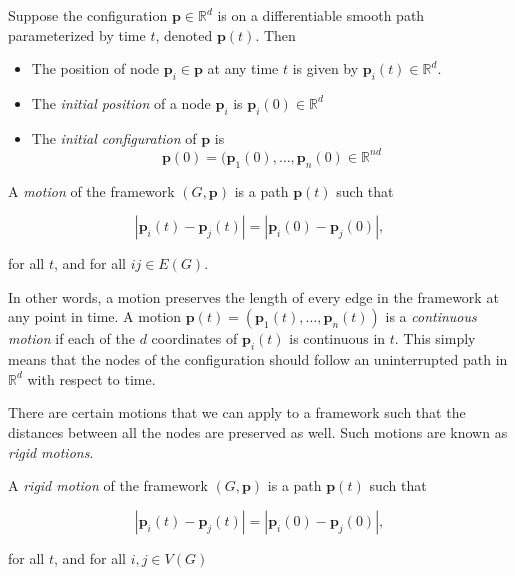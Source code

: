 \begin{definition}
Suppose the configuration $\mathbf{p} \in \mathbb{R}^d$ is on a differentiable smooth path parameterized by time $t$, denoted $\mathbf{p}(t)$. Then 

    \begin{itemize}
        \item The position of node $\mathbf{p}_i \in \mathbf{p}$ at any time $t$ is given by $\mathbf{p}_i(t) \in \mathbb{R}^d$.
        \vspace{-3mm}
        \item The \textit{initial position} of a node $\mathbf{p}_i$ is $\mathbf{p}_i(0) \in \mathbb{R}^d$
        \vspace{-3mm}
        \item The \textit{initial configuration} of $\mathbf{p}$ is 
        \[
        \mathbf{p}(0) = (\mathbf{p}_1(0), \hdots, \mathbf{p}_n(0) \in \mathbb{R}^{nd}
        \]
    \end{itemize}
\end{definition}

\begin{definition}
A \textit{motion} of the framework $(G,\mathbf{p})$ is a path $\mathbf{p}(t)$ such that 

\[
|\mathbf{p}_i(t) - \mathbf{p}_j(t)| = |\mathbf{p}_i(0) - \mathbf{p}_j(0)|,
\]

\noindent
for all $t$, and for all $ij \in E(G)$.
\end{definition}

\begin{flushleft}
In other words, a motion preserves the length of every edge in the framework at any point in time. A motion $\mathbf{p}(t) = (\mathbf{p}_1(t), \hdots, \mathbf{p}_n(t))$ is a \textit{continuous motion} if each of the $d$ coordinates of $\mathbf{p}_i(t)$ is continuous in $t$. This simply means that the nodes of the configuration should follow an uninterrupted path in $\mathbb{R}^d$ with respect to time. 
\end{flushleft}

\begin{flushleft}
There are certain motions that we can apply to a framework such that the distances between all the nodes are preserved as well. Such motions are known as \textit{rigid motions}.
\end{flushleft}

\begin{definition}
A \textit{rigid motion} of the framework $(G,\mathbf{p})$ is a path $\mathbf{p}(t)$ such that 

\[
|\mathbf{p}_i(t) - \mathbf{p}_j(t)| = |\mathbf{p}_i(0) - \mathbf{p}_j(0)|,
\]

\noindent
for all $t$, and for all $i, j \in V(G)$
\end{definition}

